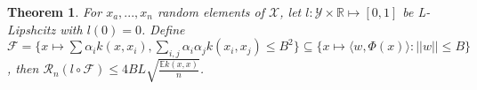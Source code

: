 \documentclass[10pt]{article}
\newcounter{lecnum}
\newtheorem{theorem}{Theorem}[lecnum]
\begin{document}
\begin{theorem}
	For $x_a,...,x_n$ random elements of $\mathcal{X}$, let $l:\mathcal{Y}\times \mathbb{R} \longmapsto [0,1]$ be L-Lipshcitz with $l(0)=0$. Define $\mathcal{F}=\{ x \longmapsto \sum \alpha_i k(x,x_i) ,  \sum_{i,j}\alpha_i\alpha_j k(x_i,x_j) \le B^2 \} \subseteq \{ x  \longmapsto \langle w,\Phi(x) \rangle : ||w|| \le B \}$, then $\mathcal{R}_n (l \circ \mathcal{F}) \le 4BL \sqrt{\frac{\mathbb{E} k(x,x)}{n}}$.
\end{theorem}
   


\end{document}
